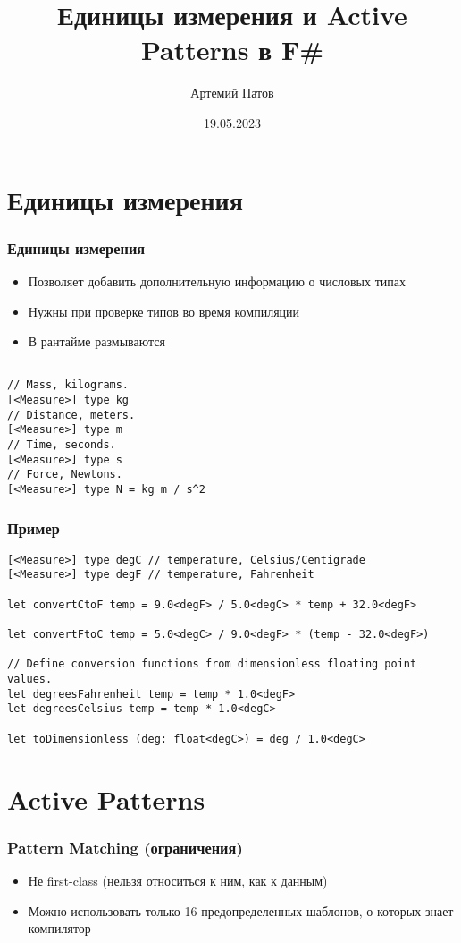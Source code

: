 \documentclass[xetex,mathserif,serif]{beamer}
\title{Единицы измерения и Active Patterns в F\#}
\author{Артемий Патов}
\date{19.05.2023}
\begin{document}
    \frame{\titlepage}

    \section{Единицы измерения}
    
    \begin{frame}[fragile]
        \frametitle{Единицы измерения}
        \begin{itemize}
            \item Позволяет добавить дополнительную информацию о числовых типах
            \item Нужны при проверке типов во время компиляции
            \item В рантайме размываются
        \end{itemize}
        \begin{verbatim}

// Mass, kilograms.
[<Measure>] type kg
// Distance, meters.
[<Measure>] type m
// Time, seconds.
[<Measure>] type s
// Force, Newtons.
[<Measure>] type N = kg m / s^2
        \end{verbatim}
    \end{frame}

    \begin{frame}[fragile]
        \frametitle{Пример}
        \begin{verbatim}
[<Measure>] type degC // temperature, Celsius/Centigrade
[<Measure>] type degF // temperature, Fahrenheit

let convertCtoF temp = 9.0<degF> / 5.0<degC> * temp + 32.0<degF>

let convertFtoC temp = 5.0<degC> / 9.0<degF> * (temp - 32.0<degF>)

// Define conversion functions from dimensionless floating point values.
let degreesFahrenheit temp = temp * 1.0<degF>
let degreesCelsius temp = temp * 1.0<degC>

let toDimensionless (deg: float<degC>) = deg / 1.0<degC>
        \end{verbatim}
    \end{frame}


    \section{Active Patterns}

    \begin{frame}[fragile]
        \frametitle{Pattern Matching (ограничения)}

        \begin{itemize}
            \item Не first-class (нельзя относиться к ним, как к данным)
            \item Можно использовать только 16 предопределенных шаблонов, о которых знает компилятор
        \end{itemize}
    \end{frame}
\end{document}

